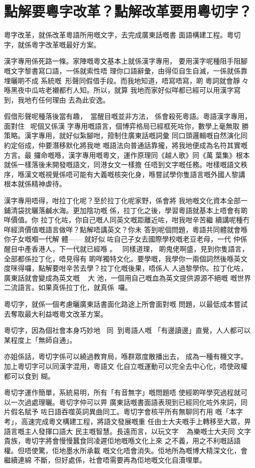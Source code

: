 \section{點解要粵字改革？點解改革要用粵切字？}



粵字改革，就係改革粵語所用嘅文字，去完成廣東話嘅書 面語構建工程。粵切字，就係粵字改革嘅最好方案。

漢字專用係死路一條。家陣嘅粵文基本上就係漢字專用， 要用漢字呢種阻手阻腳嘅文字黎書寫口語，一係就索性唔 理你口語辭彙，由得佢自生自滅，一係就係靠埋曬啲不成 系統嘅形聲同假借手段。而我地知道，唔寫唔寫，啲 粵詞就會靜々喺黑夜中瓜咗老襯都冇人知。所以，就算 我地而家好似咩都已經可以用漢字寫到，我地冇任何理由 去為此安逸。

假借形聲呢種落後當有趣，當醒目嘅並非方法， 係會殺死粵語。粵語漢字專用，面對住呢個又係漢 字專用嘅語言，個博弈格局已經框死咗你，數學上毫無取 勝策略。漢字專用，就好似紮腳咁，箝制住廣東話嘅詞彙 同口頭邏輯嘅自然演化同約定俗成，仲要潛移默化將我哋 嘅語法向普通話靠攏，將我地便成為名符其實嘅方言。最 攞命嘅喺，漢字專用嘅粵文，運作原理同《越人歌》同《萬 葉集》根本就係一樣落後未開發嘅語文，同港女文一樣擔 任唔到文字嘅任務。咁樣嘅語文秩序，喺漢文嘅視覺係唔可能有大義嘅核突化身，喺嘗試學你隻語言嘅外國人黎講 根本就係精神虐待。

漢字專用唔得，咁拉丁化呢？至於拉丁化呢家野，係會將 我地嘅文化資本全部一鋪清袋抌曬落鹹水海。更加陰功嘅 係，拉丁化之後，學習粵語就基本上唔會有啲咩價值。你 拉丁化咗，你自己嘅人同英文嘅距離近咗，咁我咁辛苦繼 續講呢種冇咩經濟價值嘅語言做咩？點解唔講英文？你未 答到呢個問題，粵語共同體就會喺你子女嘅嗰一代解 體—— 就好似咗自己子女去國際學校嘅老豆老母，一代 仲係醒目中產香港人，下一代就已經喺 。同樣道理， 啲鬼佬啊盛，見到你隻語言，全部都係拉丁化，唔見得有 啲咩獨特文化。要學嘅，我學你一兩個詞然後喺英文度咪得囉，點解要咁辛苦去學？拉丁化嘅後果，唔係人 人過黎學你。拉丁化咗，廣東話就會變成為英文嘅 大 池，一個用自己嘅血為英文提供源源不絕嘅 嘅世界 二流語言。如果真係拉丁化，就真係囉。

粵切字，就係一個考慮曬廣東話書面化路途上所會面對嘅 問題，以最低成本嘗試去奪取最大利益嘅粵文改革方案。

粵切字，因為個社會本身巧妙地 同到粵語人嘅 「有邊讀邊」直覺，人人都可以某程度上「無師自通」。

亦姐係話，粵切字係可以繞過教育局，喺群眾度散播出去， 成為一種有機文字。加上粵切字可以同漢字混用，粵語文 化自立嘅運動可以完全去中心化，唔使政權都可以食到 糊。

粵切字運作簡單，系統易明，所有「有音無字」嘅問題唔 使經啲咩學究過程就可以一次過處理曬。粵切字仲可以畀 廣東話嘅書面語表現到已經同化咗外來詞，同片假名賦予 咗日語吞噬英詞異曲同工。粵切字會核平所有無聊同冇用 嘅「本字考」，高速完成粵文構建工程，將語文發展嘅重 任由士大夫嘅手上轉移至大眾，畀語言嘅主人發揮口語大 民主嘅智慧。長遠而言，以玩文字 為樂嘅士大夫同 文字貴族，粵切字將會慢慢蠶食同凌遲佢地嘅喺文化上來 之不義，用之不利嘅話語權。但唔使驚，佢地墨水所承載 嘅文化唔會消失。佢地所為嘅博大精深文化，會繼續連綿 不斷，但好處係，社會唔需要再為佢地嘅文化自瀆埋單。


